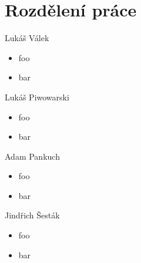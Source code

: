 \documentclass[11pt, a4paper]{article}
\begin{document}
\section{Rozdělení práce}
Lukáš Válek
\vspace{-0.6em}
\begin{itemize}
  \item{foo}
  \vspace{-0.6em}
  \item{bar}
\end{itemize}
Lukáš Piwowarski
\vspace{-0.6em}
\begin{itemize}
  \item{foo}
  \vspace{-0.6em}
  \item{bar}
\end{itemize}
Adam Pankuch
\vspace{-0.6em}
\begin{itemize}
  \item{foo}
  \vspace{-0.6em}
  \item{bar}
\end{itemize}
Jindřich Šesták
\vspace{-0.6em}
\begin{itemize}
  \item{foo}
  \vspace{-0.6em}
  \item{bar}
\end{itemize}
\end{document}
